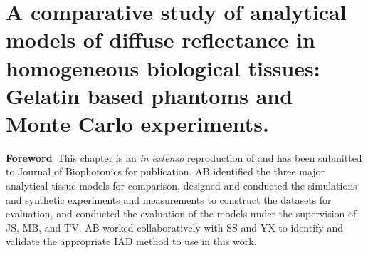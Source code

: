 




% 

\chapter[A comparative study of single layer analytical models]{A comparative study of analytical models of diffuse reflectance in homogeneous biological tissues: Gelatin based phantoms and Monte Carlo experiments.}\label{chap:1layer}

\begin{center}
\begin{minipage}[b]{0.9\linewidth}
\small
\textbf{Foreword\,}
This chapter is an \emph{in extenso} reproduction of \cite{Bahl2023a} and has been submitted to Journal of Biophotonics for publication. 
\newline
AB identified the three major analytical tissue models for comparison, designed and conducted the simulations and synthetic experiments and measurements to construct the datasets for evaluation, and conducted the evaluation of the models under the supervision of JS, MB, and TV. AB worked collaboratively with SS and YX to identify and validate the appropriate IAD method to use in this work. 
\end{minipage}
\end{center}




